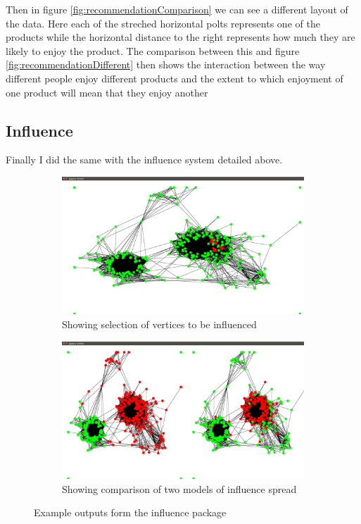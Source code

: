 \documentclass[12pt,a4paper]{article}
\begin{document}
Then in figure \ref{fig:recommendationComparison} we can see a different layout of the data. Here each of the streched horizontal polts represents one of the products while the horizontal distance to the right represents how much they are likely to enjoy the product. The comparison between this and figure \ref{fig:recommendationDifferent} then shows the interaction between the way different people enjoy different products and the extent to which enjoyment of one product will mean that they enjoy another

\subsection{Influence}

Finally I did the same with the influence system detailed above.

\begin{figure}[htb]
\centering
\captionsetup[subfigure]{justification=centering}
	\begin{subfigure}[b]{0.4\linewidth}
	\caption{Showing selection of vertices to be influenced}
	\label{fig:influenceSelect}
	\includegraphics[scale=0.1]{Influence1.png}
	\end{subfigure}
\quad
	\begin{subfigure}[b]{0.4\linewidth}
	\caption{Showing comparison of two models of influence spread}
	\label{fig:influenceCompare}
	\includegraphics[scale=0.1]{Influence3.png}
	\end{subfigure}
\caption{Example outputs form the influence package}
\label{fig:influence}
\end{figure}
\end{document}
